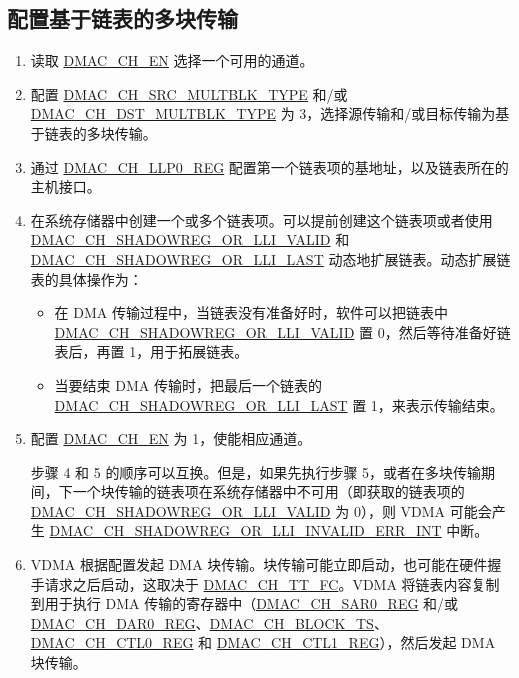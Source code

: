 \documentclass[main\_\_CN.tex]{subfiles}
\begin{document}
\subsection{配置基于链表的多块传输}
\begin{enumerate}
    \item 读取 \hyperref[fielddesc:DMACCH1EN]{DMAC\_CH\_EN} 选择一个可用的通道。
    \item 配置 \hyperref[fielddesc:DMACCHNSRCMULTBLKTYPE]{DMAC\_CH\_SRC\_MULTBLK\_TYPE} 和/或 \hyperref[fielddesc:DMACCHNDSTMULTBLKTYPE]{DMAC\_CH\_DST\_MULTBLK\_TYPE} 为 3，选择源传输和/或目标传输为基于链表的多块传输。
    \item 通过 \hyperref[regdesc:DMACCHNLLP0REG]{DMAC\_CH\_LLP0\_REG} 配置第一个链表项的基地址，以及链表所在的主机接口。
    \item 在系统存储器中创建一个或多个链表项。可以提前创建这个链表项或者使用 \hyperref[fielddesc:DMACCHNSHADOWREGORLLIVALID]{DMAC\_CH\_SHADOWREG\_OR\_LLI\_VALID} 和 \hyperref[fielddesc:DMACCHNSHADOWREGORLLILAST]{DMAC\_CH\_SHADOWREG\_OR\_LLI\_LAST} 动态地扩展链表。动态扩展链表的具体操作为：
    \begin{itemize}
        \item 在 DMA 传输过程中，当链表没有准备好时，软件可以把链表中 \hyperref[fielddesc:DMACCHNSHADOWREGORLLIVALID]{DMAC\_CH\_SHADOWREG\_OR\_LLI\_VALID} 置 0，然后等待准备好链表后，再置 1，用于拓展链表。
        \item 当要结束 DMA 传输时，把最后一个链表的 \hyperref[fielddesc:DMACCHNSHADOWREGORLLILAST]{DMAC\_CH\_SHADOWREG\_OR\_LLI\_LAST} 置 1，来表示传输结束。
    \end{itemize}
    \item 配置 \hyperref[fielddesc:DMACCH1EN]{DMAC\_CH\_EN} 为 1，使能相应通道。

\begin{tiplisting}
步骤 4 和 5 的顺序可以互换。但是，如果先执行步骤 5，或者在多块传输期间，下一个块传输的链表项在系统存储器中不可用（即获取的链表项的 \hyperref[fielddesc:DMACCHNSHADOWREGORLLIVALID]{DMAC\_CH\_SHADOWREG\_OR\_LLI\_VALID} 为 0），则 VDMA 可能会产生 \hyperref[int:DMACCHNSHADOWREGORLLIINVALIDERRINT]{DMAC\_CH\_SHADOWREG\_OR\_LLI\_INVALID\_ERR\_INT} 中断。
\end{tiplisting}

    \item VDMA 根据配置发起 DMA 块传输。块传输可能立即启动，也可能在硬件握手请求之后启动，这取决于 \hyperref[fielddesc:DMACCHNTTFC]{DMAC\_CH\_TT\_FC}。VDMA 将链表内容复制到用于执行 DMA 传输的寄存器中（\hyperref[regdesc:DMACCHNSAR0REG]{DMAC\_CH\_SAR0\_REG} 和/或 \hyperref[regdesc:DMACCHNDAR0REG]{DMAC\_CH\_DAR0\_REG}、\hyperref[fielddesc:DMACCHNBLOCKTS]{DMAC\_CH\_BLOCK\_TS}、\hyperref[regdesc:DMACCHNCTL0REG]{DMAC\_CH\_CTL0\_REG} 和 \hyperref[regdesc:DMACCHNCTL1REG]{DMAC\_CH\_CTL1\_REG}），然后发起 DMA 块传输。


\end{enumerate}
\end{document}
